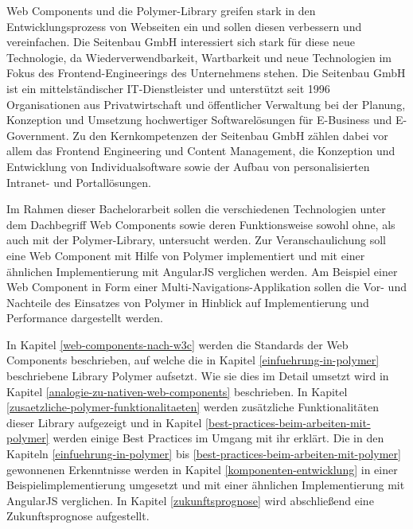 Web Components und die Polymer-Library greifen stark in den Entwicklungsprozess von Webseiten ein und sollen diesen verbessern und vereinfachen. Die Seitenbau GmbH interessiert sich stark für diese neue Technologie, da Wiederverwendbarkeit, Wartbarkeit und neue Technologien im Fokus des Frontend-Engineerings des Unternehmens stehen.
Die Seitenbau GmbH ist ein mittelständischer IT-Dienstleister und unterstützt seit 1996 Organisationen aus Privatwirtschaft und öffentlicher Verwaltung bei der Planung, Konzeption und Umsetzung hochwertiger Softwarelösungen für E-Business und E-Government. Zu den Kernkompetenzen der Seitenbau GmbH zählen dabei vor allem das Frontend Engineering und Content Management, die Konzeption und Entwicklung von Individualsoftware sowie der Aufbau von personalisierten Intranet- und Portallösungen.

Im Rahmen dieser Bachelorarbeit sollen die verschiedenen Technologien unter dem Dachbegriff Web Components sowie deren Funktionsweise sowohl ohne, als auch mit der Polymer-Library, untersucht werden. Zur Veranschaulichung soll eine Web Component mit Hilfe von Polymer implementiert und mit einer ähnlichen Implementierung mit AngularJS verglichen werden. Am Beispiel einer Web Component in Form einer Multi-Navigations-Applikation sollen die Vor- und Nachteile des Einsatzes von Polymer in Hinblick auf Implementierung und Performance dargestellt werden.

In Kapitel \ref{web-components-nach-w3c} werden die Standards der Web Components beschrieben, auf welche die in Kapitel \ref{einfuehrung-in-polymer} beschriebene Library Polymer aufsetzt. Wie sie dies im Detail umsetzt wird in Kapitel \ref{analogie-zu-nativen-web-components} beschrieben. In Kapitel \ref{zusaetzliche-polymer-funktionalitaeten} werden zusätzliche Funktionalitäten dieser Library aufgezeigt und in Kapitel \ref{best-practices-beim-arbeiten-mit-polymer} werden einige Best Practices im Umgang mit ihr erklärt. Die in den Kapiteln \ref{einfuehrung-in-polymer} bis \ref{best-practices-beim-arbeiten-mit-polymer} gewonnenen Erkenntnisse werden in Kapitel \ref{komponenten-entwicklung} in einer Beispielimplementierung umgesetzt und mit einer ähnlichen Implementierung mit AngularJS verglichen. In Kapitel \ref{zukunftsprognose} wird abschließend eine Zukunftsprognose aufgestellt.
